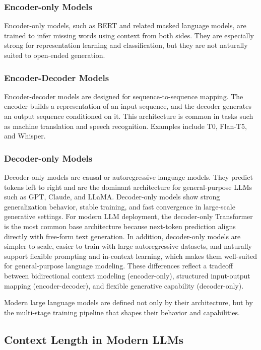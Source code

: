 \documentclass{article}
\begin{document}
\subsubsection{Encoder-only Models}
Encoder-only models, such as BERT and related masked language models, are trained to infer missing words using context from both sides. They are especially strong for representation learning and classification, but they are not naturally suited to open-ended generation.

\subsubsection{Encoder-Decoder Models}
Encoder-decoder models are designed for sequence-to-sequence mapping. The encoder builds a representation of an input sequence, and the decoder generates an output sequence conditioned on it. This architecture is common in tasks such as machine translation and speech recognition. Examples include T0, Flan-T5, and Whisper.

\subsubsection{Decoder-only Models}
Decoder-only models are causal or autoregressive language models. They predict tokens left to right and are the dominant architecture for general-purpose LLMs such as GPT, Claude, and LLaMA. Decoder-only models show strong generalization behavior, stable training, and fast convergence in large-scale generative settings. For modern LLM deployment, the decoder-only Transformer is the most common base architecture because next-token prediction aligns directly with free-form text generation. In addition, decoder-only models are simpler to scale, easier to train with large autoregressive datasets, and naturally support flexible prompting and in-context learning, which makes them well-suited for general-purpose language modeling. These differences reflect a tradeoff between bidirectional context modeling (encoder-only), structured input-output mapping (encoder-decoder), and flexible generative capability (decoder-only).

Modern large language models are defined not only by their architecture, but by the multi-stage training pipeline that shapes their behavior and capabilities.


\subsection{Context Length in Modern LLMs}
\end{document}
